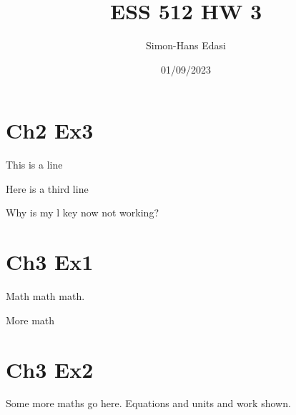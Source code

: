 \documentclass{article}
\title{ESS 512 HW 3}
\date{01/09/2023}
\author{Simon-Hans Edasi}
\begin{document}
	\maketitle



\section{Ch2 Ex3}
This is a line

Here is a third line

Why is my l key now not working?


\section{Ch3 Ex1}
Math math math.

More math



\section{Ch3 Ex2}
Some more maths go here. Equations and units and work shown.
\end{document}
